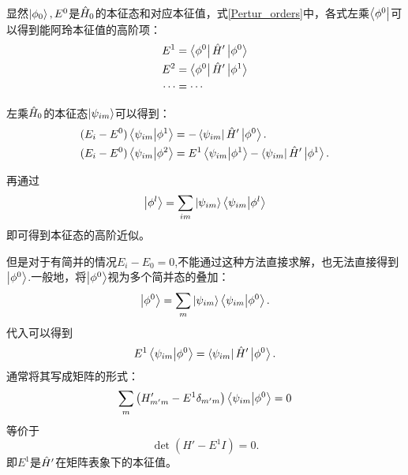 显然$\left|\phi_0\right>,E^0$是$\hat{H}_0$的本征态和对应本征值，式\ref{Pertur_orders}中，各式左乘$\left<\phi^0\right|$可以得到能阿玲本征值的高阶项：
\begin{equation}
    \begin{aligned}
    E^1&=\left<\phi^0\right|\hat{H}'\left|\phi^0\right>\\
    E^2&=\left<\phi^0\right|\hat{H}'\left|\phi^1\right>\\
    \cdots&=\cdots
    \end{aligned}
\end{equation}

左乘$\hat{H}_0$的本征态$\left|\psi_{im}\right>$可以得到：
\begin{equation}
    \begin{aligned}
        (E_i-E^0)\left<\psi_{im}\middle|\phi^1\right>&=-\left<\psi_{im}\right|\hat{H}'\left|\phi^0\right>.\\
        (E_i-E^0)\left<\psi_{im}\middle|\phi^2\right>&=E^1\left<\psi_{im}\middle|\phi^1\right>-\left<\psi_{im}\right|\hat{H}'\left|\phi^1\right>.
    \end{aligned}
\end{equation}

再通过
\begin{equation}
    \left|\phi^l\right>=\sum_{im}\left|\psi_{im}\right>\left<\psi_{im}\middle|\phi^l\right>
\end{equation}
即可得到本征态的高阶近似。

但是对于有简并的情况$E_i-E_0=0$,不能通过这种方法直接求解，也无法直接得到$\left|\phi^0\right>$.一般地，将$\left|\phi^0\right>$视为多个简并态的叠加：
\begin{equation}
    \left|\phi^0\right>=\sum_{m}\left|\psi_{im}\right>\left<\psi_{im}\middle|\phi^0\right>.
\end{equation}
代入可以得到
\begin{equation}
    E^1\left<\psi_{im}\middle|\phi^0\right>=\left<\psi_{im}\right|\hat{H}'\left|\phi^0\right>.
\end{equation}
通常将其写成矩阵的形式：
\begin{equation}
    \sum_m\left(H'_{m'm}-E^1\delta_{m'm}\right)\left<\psi_{im}\middle|\phi^0\right>=0
\end{equation}
等价于
\begin{equation}
    \det\left(H'-E^1I\right)=0.
\end{equation}
即$E^1$是$\hat{H}'$在矩阵表象下的本征值。

 
